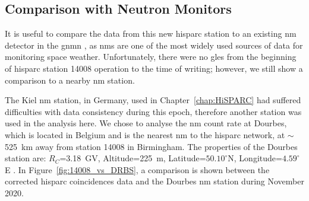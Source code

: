 \subsection{Comparison with Neutron Monitors}\label{sec:HS_14008_vs_Kiel}

It is useful to compare the data from this new \gls{hisparc} station to an existing \gls{nm} detector in the \gls{gnmn} \citep{mishev_current_2020}, as \glspl{nm} are one of the most widely used sources of data for monitoring space weather. Unfortunately, there were no \glspl{gle} from the beginning of \gls{hisparc} station 14008 operation to the time of writing; however, we still show a comparison to a nearby \gls{nm} station. %

The Kiel \gls{nm} station, in Germany, used in Chapter~\ref{chap:HiSPARC} had suffered difficulties with data consistency during this epoch, therefore another station was used in the analysis here. We chose to analyse the \gls{nm} count rate at Dourbes, which is located in Belgium and is the nearest \gls{nm} to the \gls{hisparc} network, at $\sim$525~km away from station 14008 in Birmingham. The properties of the Dourbes station are: $R_C$=3.18~GV, Altitude=225~m, Latitude=$50.10^{\circ}$N, Longitude=$4.59^{\circ}$E \citep{nmdb_nmdb_nodate}. In Figure~\ref{fig:14008_vs_DRBS}, a comparison is shown between the corrected \gls{hisparc} coincidences data and the Dourbes \gls{nm} station during November 2020.

